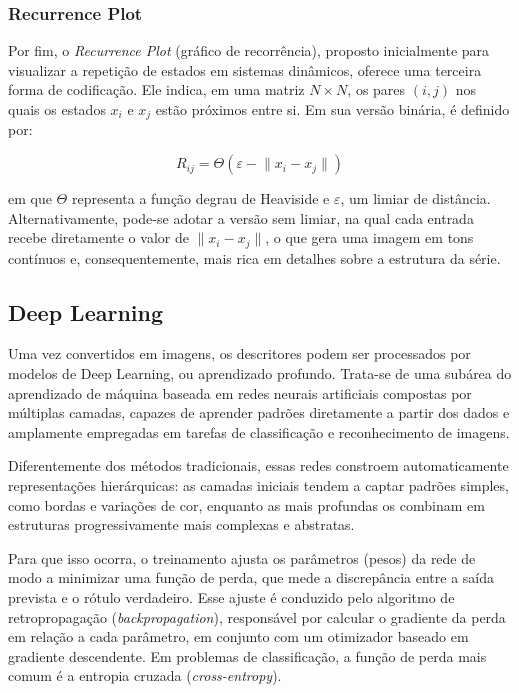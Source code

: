 \subsubsection{Recurrence Plot}
\hspace{+15pt}

Por fim, o \textit{Recurrence Plot} (gráfico de recorrência), proposto inicialmente para visualizar a repetição de estados em sistemas dinâmicos, oferece uma terceira forma de codificação. %
Ele indica, em uma matriz $N \times N$, os pares $(i,j)$ nos quais os estados $x_i$ e $x_j$ estão próximos entre si. Em sua versão binária, é definido por:

\begin{equation}
R_{ij} = \Theta\left(\varepsilon - \lVert x_i - x_j \rVert\right)
\end{equation}

\noindent em que $\Theta$ representa a função degrau de Heaviside e $\varepsilon$, um limiar de distância. Alternativamente, pode-se adotar a versão sem limiar, na qual cada entrada recebe diretamente o valor de $\lVert x_i - x_j \rVert$, o que gera uma imagem em tons contínuos e, consequentemente, mais rica em detalhes sobre a estrutura da série.

\subsection{Deep Learning}
\hspace{+15pt}

Uma vez convertidos em imagens, os descritores podem ser processados por modelos de Deep Learning, ou aprendizado profundo. Trata-se de uma subárea do aprendizado de máquina baseada em redes neurais artificiais compostas por múltiplas camadas, capazes de aprender padrões diretamente a partir dos dados e amplamente empregadas em tarefas de classificação e reconhecimento de imagens.

Diferentemente dos métodos tradicionais, essas redes constroem automaticamente representações hierárquicas: as camadas iniciais tendem a captar padrões simples, como bordas e variações de cor, enquanto as mais profundas os combinam em estruturas progressivamente mais complexas e abstratas. %

Para que isso ocorra, o treinamento ajusta os parâmetros (pesos) da rede de modo a minimizar uma função de perda, que mede a discrepância entre a saída prevista e o rótulo verdadeiro. Esse ajuste é conduzido pelo algoritmo de retropropagação (\textit{backpropagation}), responsável por calcular o gradiente da perda em relação a cada parâmetro, em conjunto com um otimizador baseado em gradiente descendente. Em problemas de classificação, a função de perda mais comum é a entropia cruzada (\textit{cross-entropy}). %


